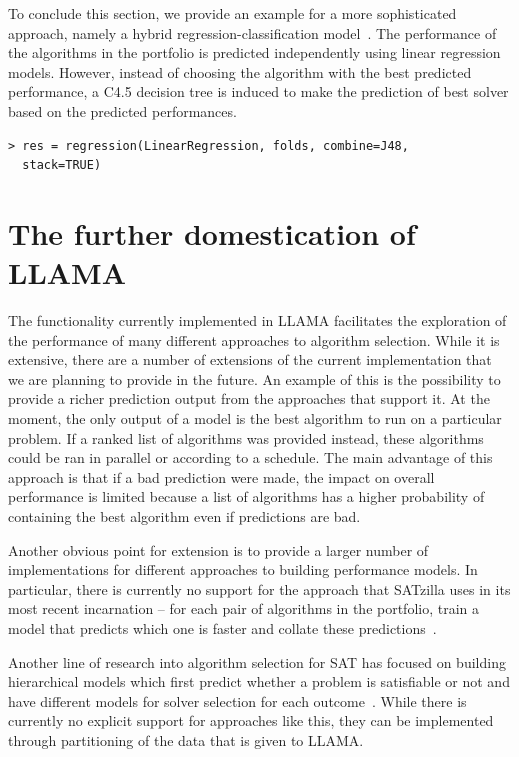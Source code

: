 \documentclass{llncs}
\begin{document}
To conclude this section, we provide an example for a more sophisticated
approach, namely a hybrid regression-classification
model~\cite{kotthoff_hybrid_2012}. The performance of the algorithms in the
portfolio is predicted independently using linear regression models. However,
instead of choosing the algorithm with the best predicted performance, a C4.5
decision tree is induced to make the prediction of best solver based on the
predicted performances.

\begin{verbatim}
> res = regression(LinearRegression, folds, combine=J48,
  stack=TRUE)
\end{verbatim}


\section{The further domestication of LLAMA}

The functionality currently implemented in LLAMA facilitates the exploration of
the performance of many different approaches to algorithm selection. While it is
extensive, there are a number of extensions of the current implementation that
we are planning to provide in the future. An example of this is the possibility
to provide a richer prediction output from the approaches that support it. At
the moment, the only output of a model is the best algorithm to run on a
particular problem. If a ranked list of algorithms was provided instead, these
algorithms could be ran in parallel or according to a schedule. The main
advantage of this approach is that if a bad prediction were made, the impact on
overall performance is limited because a list of algorithms has a higher
probability of containing the best algorithm even if predictions are bad.

Another obvious point for extension is to provide a larger number of
implementations for different approaches to building performance models. In
particular, there is currently no support for the approach that SATzilla uses in
its most recent incarnation -- for each pair of algorithms in the portfolio,
train a model that predicts which one is faster and collate these
predictions~\cite{xu_hydra-mip_2011}.

Another line of research into algorithm selection for SAT has focused on
building hierarchical models which first predict whether a problem is
satisfiable or not and have different models for solver selection for each
outcome~\cite{xu_hierarchical_2007}. While there is currently no explicit
support for approaches like this, they can be implemented through partitioning
of the data that is given to LLAMA.
\end{document}
